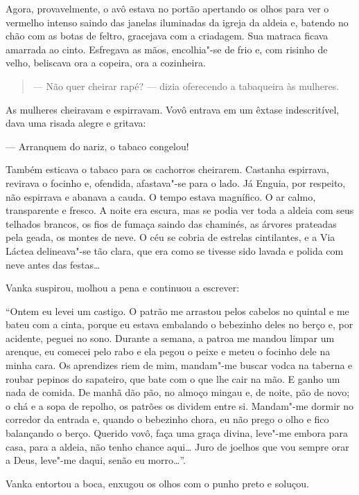 Agora, provavelmente, o avô estava no portão apertando os olhos para ver
o vermelho intenso saindo das janelas iluminadas da igreja da aldeia
e, batendo no chão com as botas de feltro, gracejava com a criadagem.
Sua matraca ficava amarrada ao cinto. Esfregava as mãos, encolhia"-se de
frio e, com risinho de velho, beliscava ora a copeira, ora a cozinheira.

\begin{quote}
--- Não quer cheirar rapé? --- dizia oferecendo a tabaqueira às
mulheres.
\end{quote}

As mulheres cheiravam e espirravam. Vovô entrava em um êxtase
indescritível, dava uma risada alegre e gritava:

--- Arranquem do nariz, o tabaco congelou!

Também esticava o tabaco para os cachorros cheirarem. Castanha
espirrava, revirava o focinho e, ofendida, afastava"-se para o lado. Já
Enguia, por respeito, não espirrava e abanava a cauda. O tempo estava
magnífico. O ar calmo, transparente e fresco. A noite era escura, mas se
podia ver toda a aldeia com seus telhados brancos, os fios de fumaça
saindo das chaminés, as árvores prateadas pela geada, os montes de neve.
O céu se cobria de estrelas cintilantes, e a Via Láctea delineava"-se tão
clara, que era como se tivesse sido lavada e polida com neve antes das
festas\ldots{}

Vanka suspirou, molhou a pena e continuou a escrever:

``Ontem eu levei um castigo. O patrão me arrastou pelos cabelos no
quintal e me bateu com a cinta, porque eu estava embalando o bebezinho
deles no berço e, por acidente, peguei no sono. Durante a semana, a
patroa me mandou limpar um arenque, eu comecei pelo rabo e ela pegou o
peixe e meteu o focinho dele na minha cara. Os aprendizes riem de mim,
mandam"-me buscar vodca na taberna e roubar pepinos do sapateiro, que
bate com o que lhe cair na mão. E ganho um nada de comida. De manhã dão
pão, no almoço mingau e, de noite, pão de novo; o chá e a sopa de
repolho, os patrões os dividem entre si. Mandam"-me dormir no corredor da
entrada e, quando o bebezinho chora, eu não prego o olho e fico
balançando o berço. Querido vovô, faça uma graça divina, leve"-me embora
para casa, para a aldeia, não tenho chance aqui\ldots{} Juro de joelhos que
vou sempre orar a Deus, leve"-me daqui, senão eu morro\ldots{}''.

Vanka entortou a boca, enxugou os olhos com o punho preto e soluçou.


